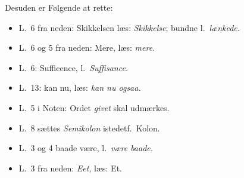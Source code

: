 \documentclass[12pt,a4paper]{book}
\begin{document}
\noindent Desuden er Følgende at rette:
\begin{itemize}[leftmargin=3.2em,itemsep=0pt]
  \item[Pag.\ 2] L.\ 6 fra neden: Skikkelsen læs: \emph{Skikkelse}; bundne l.\ \emph{lænkede.}
  \item[--- 21] L.\ 6 og 5 fra neden: Mere, læs: \emph{mere.}
  \item[--- 32] L.\ 6: Sufficence, l.\ \emph{Suffisance.}
  \item[--- 39] L.\ 13: kan nu, læs: \emph{kan nu ogsaa.}
  \item[--- 50] L.\ 5 i Noten: Ordet \emph{givet} skal udmærkes.
  \item[--- 52] L.\ 8 sættes \emph{Semikolon} istedetf.\ Kolon.
  \item[--- 53] L.\ 3 og 4 baade være, l.\ \emph{være baade.}
  \item[--- ---] L.\ 3 fra neden: \emph{Eet}, læs: Et.
\end{itemize}

\cleardoublepage

\end{document}
